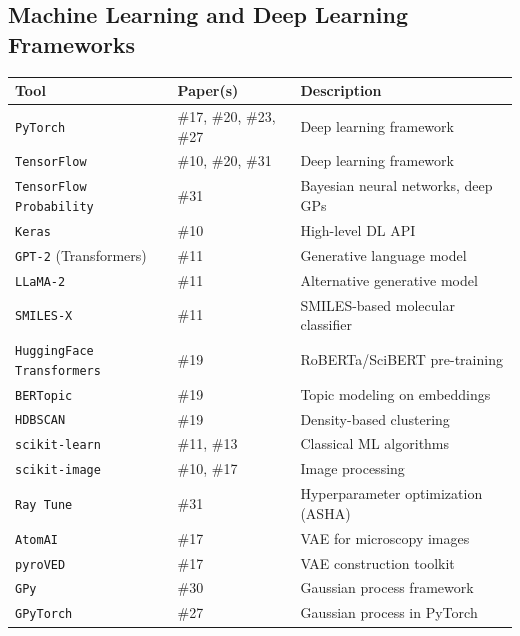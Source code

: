 \documentclass[11pt,letterpaper]{article}
\newcommand{\tool}[1]{\texttt{#1}}
\begin{document}
\subsection{Machine Learning and Deep Learning Frameworks}

\begin{longtable}{l l p{6cm}}
\toprule
\textbf{Tool} & \textbf{Paper(s)} & \textbf{Description} \\
\midrule
\tool{PyTorch}         & \#17, \#20, \#23, \#27 & Deep learning framework \\
\tool{TensorFlow}      & \#10, \#20, \#31       & Deep learning framework \\
\tool{TensorFlow Probability} & \#31            & Bayesian neural networks, deep GPs \\
\tool{Keras}           & \#10                   & High-level DL API \\
\tool{GPT-2} (Transformers) & \#11              & Generative language model \\
\tool{LLaMA-2}         & \#11                   & Alternative generative model \\
\tool{SMILES-X}        & \#11                   & SMILES-based molecular classifier \\
\tool{HuggingFace Transformers} & \#19          & RoBERTa/SciBERT pre-training \\
\tool{BERTopic}        & \#19                   & Topic modeling on embeddings \\
\tool{HDBSCAN}         & \#19                   & Density-based clustering \\
\tool{scikit-learn}    & \#11, \#13             & Classical ML algorithms \\
\tool{scikit-image}    & \#10, \#17             & Image processing \\
\tool{Ray Tune}        & \#31                   & Hyperparameter optimization (ASHA) \\
\tool{AtomAI}          & \#17                   & VAE for microscopy images \\
\tool{pyroVED}         & \#17                   & VAE construction toolkit \\
\tool{GPy}             & \#30                   & Gaussian process framework \\
\tool{GPyTorch}        & \#27                   & Gaussian process in PyTorch \\

\end{longtable}
\end{document}
